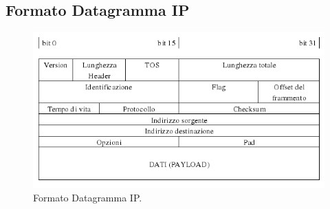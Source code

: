 \newpage
\subsection{Formato Datagramma IP}
\begin{figure}[h]
    \centering
    \includegraphics[scale=0.5]{Immagini/IPFormatoDatagramma.png}
    \caption{Formato Datagramma IP.}
\end{figure}

